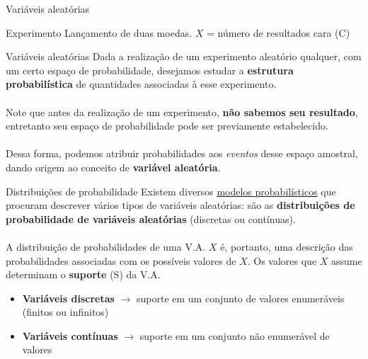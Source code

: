 \documentclass[10pt]{beamer}\usepackage[]{graphicx}\usepackage[]{color}
\theoremstyle{definition}
\begin{document}
\begin{frame}[fragile=singleslide]{Variáveis aleatórias}
\begin{block}{Experimento}
Lançamento de duas moedas. $X$ = número de resultados cara (C)
\end{block}
\begin{center}
    
  \end{center}
\end{frame}

\begin{frame}[fragile=singleslide]{Variáveis aleatórias}
  Dada a realização de um experimento aleatório qualquer, com um certo
  espaço de probabilidade, desejamos estudar a \textbf{estrutura
    probabilística} de quantidades associadas à esse experimento. \\~\\
  Note que antes da realização de um experimento, \textbf{não sabemos seu
  resultado}, entretanto seu espaço de probabilidade pode ser
  previamente estabelecido.\\~\\
  Dessa forma, podemos atribuir probabilidades aos \emph{eventos} desse
  espaço amostral, dando origem ao conceito de \textbf{variável
    aleatória}.
\end{frame}

\begin{frame}[fragile=singleslide]{Distribuições de probabilidade}
Existem diversos \underline{modelos probabilísticos} que
procuram descrever vários tipos de variáveis aleatórias: são as
\textbf{distribuições de probabilidade de variáveis aleatórias}
(discretas ou contínuas). \\~\\

A distribuição de probabilidades de uma V.A. $X$ é, portanto, uma
descrição das probabilidades associadas com os possíveis valores de
$X$. Os valores que $X$ assume determinam o \textbf{suporte} (S) da V.A.
\vspace{1em}
\begin{itemize}
\item \textbf{Variáveis discretas} $\rightarrow$ suporte em um conjunto
  de valores enumeráveis (finitos ou infinitos)
\item \textbf{Variáveis contínuas} $\rightarrow$ suporte em um conjunto
  não enumerável de valores
\end{itemize}
\end{frame}
\end{document}
